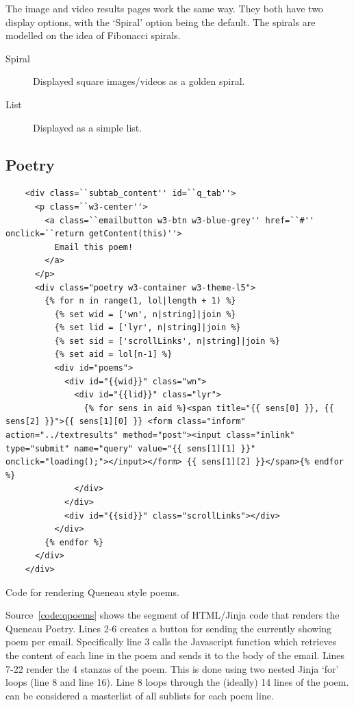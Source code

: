 
The image and video results pages work the same way. They both have two display options, with the `Spiral' option being the default. The spirals are modelled on the idea of Fibonacci spirals.
\begin{description}
  \item [Spiral] Displayed square images/videos as a golden spiral.
  \item [List] Displayed as a simple list.
\end{description}


\subsection{Poetry}
\label{s:poetry}

\begin{listing}[h!]
  \begin{verbatim}
    <div class=``subtab_content'' id=``q_tab''>
      <p class=``w3-center''>
        <a class=``emailbutton w3-btn w3-blue-grey'' href=``#'' onclick=``return getContent(this)''>
          Email this poem!
        </a>
      </p>
      <div class="poetry w3-container w3-theme-l5">
        {% for n in range(1, lol|length + 1) %}
          {% set wid = ['wn', n|string]|join %}
          {% set lid = ['lyr', n|string]|join %}
          {% set sid = ['scrollLinks', n|string]|join %}
          {% set aid = lol[n-1] %}
          <div id="poems">
            <div id="{{wid}}" class="wn">
              <div id="{{lid}}" class="lyr">
                {% for sens in aid %}<span title="{{ sens[0] }}, {{ sens[2] }}">{{ sens[1][0] }} <form class="inform" action="../textresults" method="post"><input class="inlink" type="submit" name="query" value="{{ sens[1][1] }}" onclick="loading();"></input></form> {{ sens[1][2] }}</span>{% endfor %}
              </div>
            </div>
            <div id="{{sid}}" class="scrollLinks"></div>
          </div>
        {% endfor %}
      </div>
    </div>
  \end{verbatim}
\caption{Code for rendering Queneau style poems.}
\label{code:qpoems}
\end{listing}

Source~\ref{code:qpoems} shows the segment of HTML/Jinja code that renders the Queneau Poetry. Lines 2-6 creates a button for sending the currently showing poem per email. Specifically line \num{3} calls the Javascript function  which retrieves the content of each line in the poem and sends it to the body of the email. Lines \num{7}-\num{22} render the \num{4} stanzas of the poem. This is done using two nested Jinja `for' loops (line \num{8} and line \num{16}). Line \num{8} loops through the (ideally) \num{14} lines of the poem.  can be considered a masterlist of all sublists for each poem line.

